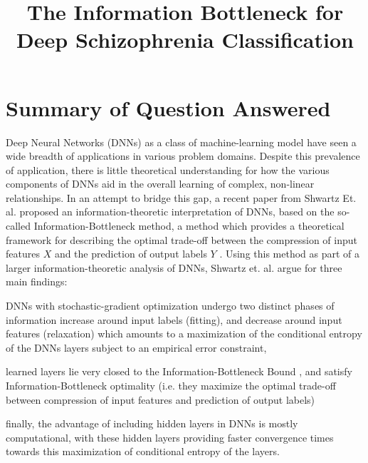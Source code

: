 \documentclass[conference, 5pt]{IEEEtran}
\begin{document}
\title{The Information Bottleneck for Deep Schizophrenia Classification}
\renewcommand{\todo}[1]{\color{red}{#1}\color{black}}
\author{
\and
{}
}

\maketitle


\IEEEpeerreviewmaketitle

\section{Summary of Question Answered}
Deep Neural Networks (DNNs) as a class of machine-learning model have seen a wide breadth of applications in various problem domains. Despite this prevalence of application, there is little theoretical understanding for how the various components of DNNs aid in the overall learning of complex, non-linear relationships. In an attempt to bridge this gap, a recent paper from Shwartz Et. al. proposed an information-theoretic interpretation of DNNs, based on the so-called Information-Bottleneck \cite{shwartz2017opening} method, a method which provides a theoretical framework for describing the optimal trade-off between the compression of input features $X$ and the prediction of output labels $Y$ \cite{tishby2000information}. Using this method as part of a larger information-theoretic analysis of DNNs, Shwartz et. al. argue for three main findings: 
\begin{enumerate*}
\item DNNs with stochastic-gradient optimization undergo two distinct phases of information increase around input labels (fitting), and decrease around input features (relaxation) which amounts to a maximization of the conditional entropy of the DNNs layers subject to an empirical error constraint,
\item  learned layers lie very closed to the Information-Bottleneck Bound \cite{tishby2000information}, and satisfy Information-Bottleneck optimality (i.e. they maximize the optimal trade-off between compression of input features and prediction of output labels)
\item finally, the advantage of including hidden layers in DNNs is mostly computational, with these hidden layers providing faster convergence times towards this maximization of conditional entropy of the layers.
\end{enumerate*}\cite{shwartz2017opening}
\end{document}
